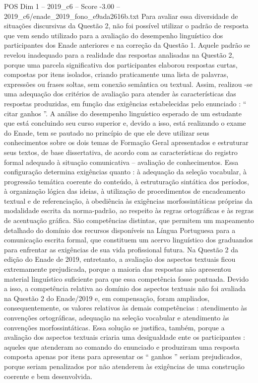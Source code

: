 \begin{textsample}{POS Dim 1 – 2019\_c6 – Score -3.00 – 2019\_c6/enade\_2019\_fono\_e9ada2616b.txt}
Para avaliar essa diversidade de situações discursivas da Questão 2, não foi possível utilizar o padrão de resposta que vem sendo utilizado para a avaliação do desempenho linguístico dos participantes dos Enade anteriores e na correção da Questão 1.
Aquele padrão se revelou inadequado para a realidade das respostas analisadas na Questão 2, porque uma parcela significativa dos participantes elaborou respostas curtas, compostas por itens isolados, criando praticamente uma lista de palavras, expressões ou frases soltas, sem conexão semântica ou textual.
Assim, realizou -se uma adequação dos critérios de avaliação para atender às características das respostas produzidas, em função das exigências estabelecidas pelo enunciado : “ citar ganhos ”.
A análise do desempenho linguístico esperado de um estudante que está concluindo seu curso superior e, devido a isso, está realizando o exame do Enade, tem se pautado no princípio de que ele deve utilizar seus conhecimentos sobre os dois temas de Formação Geral apresentados e estruturar seus textos, de base dissertativa, de acordo com as características do registro formal adequado à situação comunicativa – avaliação de conhecimentos.
Essa configuração determina exigências quanto : à adequação da seleção vocabular, à progressão temática coerente do conteúdo, à estruturação sintática dos períodos, à organização lógica das ideias, à utilização de procedimentos de encadeamento textual e de referenciação, à obediência às exigências morfossintáticas próprias da modalidade escrita da norma-padrão, ao respeito às regras ortográficas e às regras de acentuação gráfica.
São competências distintas, que permitem um mapeamento detalhado do domínio dos recursos disponíveis na Língua Portuguesa para a comunicação escrita formal, que constituem um acervo linguístico dos graduandos para enfrentar as exigências de sua vida profissional futura.
Na Questão 2 da edição do Enade de 2019, entretanto, a avaliação dos aspectos textuais ficou extremamente prejudicada, porque a maioria das respostas não apresentou material linguístico suficiente para que essa competência fosse pontuada.
Devido a isso, a competência relativa ao domínio dos aspectos textuais não foi avaliada na Questão 2 do Enade/2019 e, em compensação, foram ampliados, consequentemente, os valores relativos às demais competências : atendimento às convenções ortográficas, adequação na seleção vocabular e atendimento às convenções morfossintáticas.
Essa solução se justifica, também, porque a avaliação dos aspectos textuais criaria uma desigualdade ente os participantes : aqueles que atenderam ao comando do enunciado e produziram uma resposta composta apenas por itens para apresentar os “ ganhos ” seriam prejudicados, porque seriam penalizados por não atenderem às exigências de uma construção coerente e bem desenvolvida.

\end{textsample}
